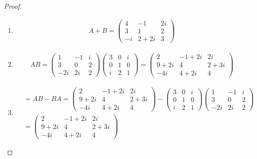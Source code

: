 \documentclass{article}
\begin{document}
\begin{proof}
    
    \hfil

    \begin{enumerate}
        \item \begin{align}
            A+B = \begin{pmatrix}
                4&-1&2i\\3&1&2\\-i&2+2i&3
            \end{pmatrix}
        \end{align}
        \item \begin{align}
            AB = \begin{pmatrix} 1 & -1 & i \\ 3 & 0 & 2 \\ -2i & 2i & 2 \end{pmatrix}\begin{pmatrix} 3 & 0 & i \\ 0 & 1 & 0 \\ i & 2 & 1 \end{pmatrix} = \begin{pmatrix}
                2&-1+2i&2i\\9+2i&4&2+3i\\-4i&4+2i&4
            \end{pmatrix}
        \end{align}
        \item \begin{align}
            [A,B] &= AB-BA = \begin{pmatrix}
                2&-1+2i&2i\\9+2i&4&2+3i\\-4i&4+2i&4
            \end{pmatrix}-\begin{pmatrix} 3 & 0 & i \\ 0 & 1 & 0 \\ i & 2 & 1 \end{pmatrix}\begin{pmatrix} 1 & -1 & i \\ 3 & 0 & 2 \\ -2i & 2i & 2 \end{pmatrix}\\
            &= \begin{pmatrix}
                2&-1+2i&2i\\9+2i&4&2+3i\\-4i&4+2i&4

\end{pmatrix}
\end{align}
\end{enumerate}
\end{proof}
\end{document}

